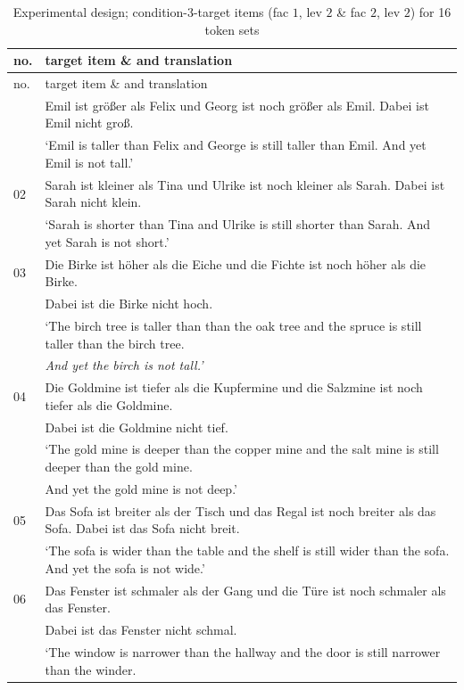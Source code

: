 \documentclass[output=paper
,modfonts
,nonflat]{langsci/langscibook}
\begin{document}
\begin{longtable}{lp{317.90625pt}}
\caption{Experimental design; condition-3-target items (fac $1$, lev $2$ \& fac $2$, lev $2$) for 16 token sets\label{tab:16_contexts}}\\
\lsptoprule no. & target item \& and translation\\\midrule\endfirsthead\midrule no. & target item \& and translation\\\midrule\endhead\endfoot\lspbottomrule\endlastfoot
01 & Emil ist größer als Felix und Georg ist noch größer als Emil. Dabei ist Emil nicht groß. \\
   & {`Emil is taller than Felix and George is still taller than Emil. And yet Emil is not tall.'}\\
\midrule
02 & Sarah ist kleiner als Tina und Ulrike ist noch kleiner als Sarah. Dabei ist Sarah nicht klein.\\
   & {`Sarah is shorter than Tina and Ulrike is still shorter than Sarah. And yet Sarah is not short.'}\\
\midrule 
03 & Die Birke ist höher als die Eiche und die Fichte ist noch höher als die Birke. \\
   & Dabei ist die Birke nicht hoch.\\
   & {`The birch tree is taller than than the oak tree and the spruce is still taller than the birch tree.}\\
   & \textit{And yet the birch is not tall.'}\\
\midrule
04 & Die Goldmine ist tiefer als die Kupfermine und die Salzmine ist noch tiefer als die Goldmine. \\
   & Dabei ist die Goldmine nicht tief. \\
   & {`The gold mine is deeper than the copper mine and the salt mine is still deeper than the gold mine.} \\
   & {And yet the gold mine is not deep.'}\\
\midrule
05 & Das Sofa ist breiter als der Tisch und das Regal ist noch breiter als das Sofa. Dabei ist das Sofa nicht breit.\\
   & {`The sofa is wider than the table and the shelf is still wider than the sofa. And yet the sofa is not wide.'}\\
\midrule
06 & Das Fenster ist schmaler als der Gang und die Türe ist noch schmaler als das Fenster.\\
   & Dabei ist das Fenster nicht schmal.\\
   & {`The window is narrower than the hallway and the door is still narrower than the winder.} \\

\end{longtable}
\end{document}
